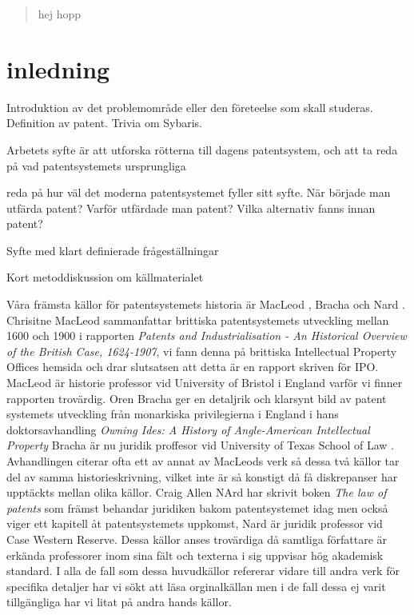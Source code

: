 \begin{abstract}
	hej hopp
\end{abstract}	
	
	
\section{inledning}
Introduktion av det problemområde eller den företeelse som skall studeras. 
Definition av patent. Trivia om Sybaris.

Arbetets syfte är att utforska rötterna till dagens patentsystem, och att ta
reda på vad patentsystemets ursprungliga 

reda på hur väl det moderna patentsystemet fyller sitt syfte. När började man 
utfärda patent? Varför utfärdade man patent? Vilka alternativ fanns innan 
patent? 

Syfte med klart definierade frågeställningar

Kort metoddiskussion om källmaterialet

Våra främsta källor för patentsystemets historia är MacLeod \cite{macleod}, 
Bracha \cite{bracha} och Nard \cite{nard}. Chrisitne MacLeod sammanfattar 
brittiska patentsystemets utveckling mellan 1600 och 1900 i rapporten \emph{
Patents and Industrialisation - An Historical Overview of the British Case, 
1624-1907}, vi fann denna på brittiska Intellectual Property Offices hemsida 
och drar slutsatsen att detta är en rapport skriven för IPO. MacLeod är 
historie professor vid University of Bristol i England varför vi finner 
rapporten trovärdig. Oren Bracha ger en detaljrik och klarsynt bild av patent 
systemets utveckling från monarkiska privilegierna i England i hans 
doktorsavhandling \emph{Owning Ides: A History of Angle-American Intellectual 
Property} Bracha är nu juridik proffesor vid University of Texas School of Law
. Avhandlingen citerar ofta ett av annat av MacLeods verk så dessa två källor 
tar del av samma historieskrivning, vilket inte är så konstigt då få 
diskrepanser har upptäckts mellan olika källor. Craig Allen NArd har skrivit 
boken \emph{The law of patents} som främst behandar juridiken bakom 
patentsystemet idag men också viger ett kapitell åt patentsystemets uppkomst, 
Nard är juridik professor vid Case Western Reserve. Dessa källor anses 
trovärdiga då samtliga författare är erkända professorer inom sina fält och 
texterna i sig uppvisar hög akademisk standard. I alla de fall som dessa 
huvudkällor refererar vidare till andra verk för specifika detaljer har vi 
sökt att läsa orginalkällan men i de fall dessa ej varit tillgängliga har vi 
litat på andra hands källor.
  


